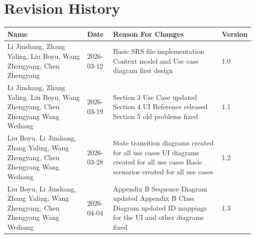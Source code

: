 \documentclass[a4paper,12pt]{article}
\begin{document}
\renewcommand{\contentsname}{\fontsize{18}{22}\selectfont\bfseries Table of Contents}
\tableofcontents

\vspace{1cm}

\section*{Revision History}

\begin{longtable}{|p{3.5cm}|p{2cm}|p{6cm}|p{2cm}|}
\hline
\textbf{Name} & \textbf{Date} & \textbf{Reason For Changes} & \textbf{Version} \\
\hline
Li Jinshang,\newline
Zhang Yaling,\newline
Liu Boyu,\newline
Wang Zhengyang,\newline
Chen Zhengyang
&
2026-03-12
&
Basic SRS file implementation\newline
Context model and Use case diagram first design
&
1.0 \\
\hline
Li Jinshang,\newline
Zhang Yaling,\newline
Liu Boyu,\newline
Wang Zhengyang,\newline
Chen Zhengyang\newline
Wang Weihang
&
2026-03-19
&
Section 3 Use Case updated\newline
Section 4 UI Reference released\newline
Section 5 old problems fixed
&
1.1 \\
\hline
Liu Boyu,\newline
Li Jinshang,\newline
Zhang Yaling,\newline
Wang Zhengyang,\newline
Chen Zhengyang\newline
Wang Weihang
&
2026-03-28
&
State transition diagrams created for all use cases\newline
UI diagrams created for all use cases\newline
Basic scenarios created for all use cases
&
1.2 \\
\hline
Liu Boyu,\newline
Li Jinshang,\newline
Zhang Yaling,\newline
Wang Zhengyang,\newline
Chen Zhengyang\newline
Wang Weihang
&
2026-04-04
&
Appendix B Sequence Diagram updated\newline
Appendix B Class Diagram updated\newline
ID mappings for the UI and other diagrams fixed
&
1.3 \\
\hline
\end{longtable}
\end{document}
